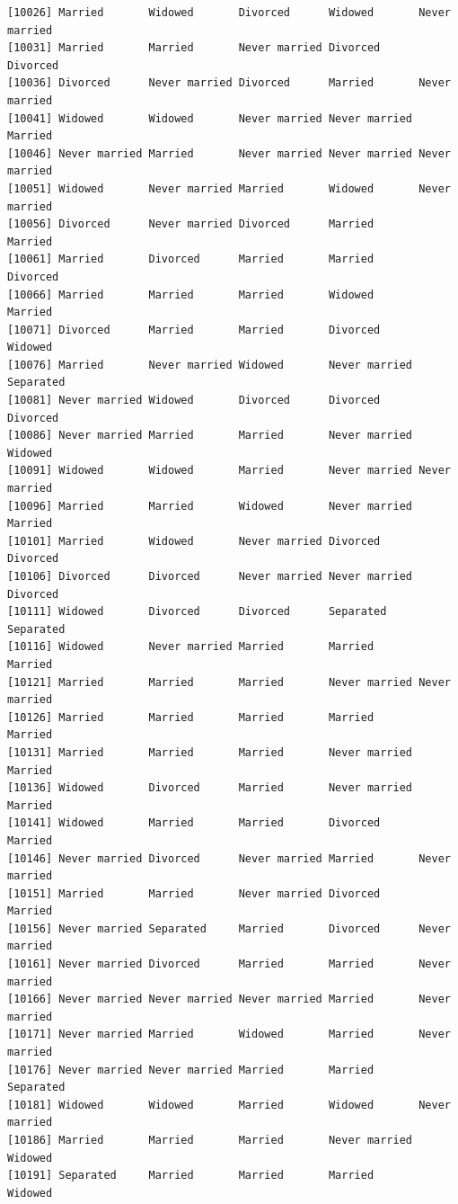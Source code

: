 \documentclass[
  letterpaper,
  DIV=11,
  numbers=noendperiod,
  oneside]{scrartcl}
\begin{document}
\begin{verbatim}
[10026] Married       Widowed       Divorced      Widowed       Never married
[10031] Married       Married       Never married Divorced      Divorced     
[10036] Divorced      Never married Divorced      Married       Never married
[10041] Widowed       Widowed       Never married Never married Married      
[10046] Never married Married       Never married Never married Never married
[10051] Widowed       Never married Married       Widowed       Never married
[10056] Divorced      Never married Divorced      Married       Married      
[10061] Married       Divorced      Married       Married       Divorced     
[10066] Married       Married       Married       Widowed       Married      
[10071] Divorced      Married       Married       Divorced      Widowed      
[10076] Married       Never married Widowed       Never married Separated    
[10081] Never married Widowed       Divorced      Divorced      Divorced     
[10086] Never married Married       Married       Never married Widowed      
[10091] Widowed       Widowed       Married       Never married Never married
[10096] Married       Married       Widowed       Never married Married      
[10101] Married       Widowed       Never married Divorced      Divorced     
[10106] Divorced      Divorced      Never married Never married Divorced     
[10111] Widowed       Divorced      Divorced      Separated     Separated    
[10116] Widowed       Never married Married       Married       Married      
[10121] Married       Married       Married       Never married Never married
[10126] Married       Married       Married       Married       Married      
[10131] Married       Married       Married       Never married Married      
[10136] Widowed       Divorced      Married       Never married Married      
[10141] Widowed       Married       Married       Divorced      Married      
[10146] Never married Divorced      Never married Married       Never married
[10151] Married       Married       Never married Divorced      Married      
[10156] Never married Separated     Married       Divorced      Never married
[10161] Never married Divorced      Married       Married       Never married
[10166] Never married Never married Never married Married       Never married
[10171] Never married Married       Widowed       Married       Never married
[10176] Never married Never married Married       Married       Separated    
[10181] Widowed       Widowed       Married       Widowed       Never married
[10186] Married       Married       Married       Never married Widowed      
[10191] Separated     Married       Married       Married       Widowed      

\end{verbatim}
\end{document}
